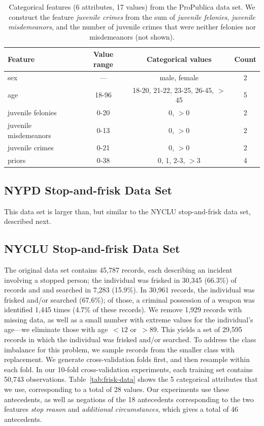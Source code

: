 \documentclass[twoside,11pt]{article}
\begin{document}
\begin{table}[h!]
\centering
\begin{tabular}{l  | c  c  c}
Feature & Value range & Categorical values & Count \\
\hline
sex & --- & male, female & 2 \\
age & 18-96 & 18-20, 21-22, 23-25, 26-45, $>$45  & 5 \\
juvenile felonies & 0-20 & 0, $>$0 & 2 \\
juvenile misdemeanors & 0-13 & 0, $>$0 & 2 \\
juvenile crimes & 0-21 & 0, $>$0 & 2 \\
priors & 0-38 & 0, 1, 2-3, $>$3 & 4
\end{tabular}
\caption{Categorical features (6 attributes, 17 values) from the ProPublica data set.
We construct the feature \emph{juvenile crimes} from the sum of
\emph{juvenile felonies}, \emph{juvenile misdemeanors}, and
the number of juvenile crimes that were neither felonies nor misdemeanors (not shown).
}
\vspace{4mm}
\label{tab:recidivism-data}
\end{table}

\subsection{NYPD Stop-and-frisk Data Set}
This data set is larger than, but similar to the NYCLU stop-and-frisk data set, 
described next.

\subsection{NYCLU Stop-and-frisk Data Set}
The original data set contains 45,787 records,
each describing an incident involving a stopped person; the individual
was frisked in 30,345 (66.3\%) of records and and searched in 7,283 (15.9\%).
%
In 30,961 records, the individual was frisked and/or searched (67.6\%); of those,
a criminal possession of a weapon was identified 1,445 times (4.7\% of these records).
%
We remove 1,929 records with missing data, as well as a small number with extreme values
for the individual's age---we eliminate those with age~${< 12}$ or~${>89}$.
%
This yields a set of 29,595 records in which the individual was frisked and/or searched.
%
To address the class imbalance for this problem, we sample records from the
smaller class with replacement.
%
We generate cross-validation folds first, and then resample within each fold.
%
In our 10-fold cross-validation experiments, each training set contains 50,743 observations.
%
Table~\ref{tab:frisk-data} shows the 5 categorical attributes that we use,
corresponding to a total of 28 values.
%
Our experiments use these antecedents,
as well as negations of the 18 antecedents corresponding to the two features
\emph{stop reason} and \emph{additional circumstances},
which gives a total of 46 antecedents.
\end{document}
